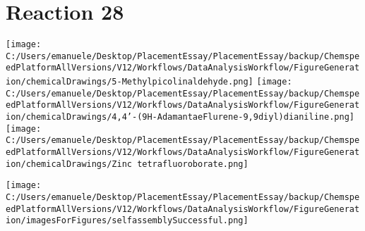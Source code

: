 \documentclass{article}%
\begin{document}
\section*{Reaction 28}%
%
\begin{scheme}[H]%
\begin{minipage}{0.5\textwidth}%
\texttt{[image: C:/Users/emanuele/Desktop/PlacementEssay/PlacementEssay/backup/ChemspeedPlatformAllVersions/V12/Workflows/DataAnalysisWorkflow/FigureGeneration/chemicalDrawings/5-Methylpicolinaldehyde.png]}%
\texttt{[image: C:/Users/emanuele/Desktop/PlacementEssay/PlacementEssay/backup/ChemspeedPlatformAllVersions/V12/Workflows/DataAnalysisWorkflow/FigureGeneration/chemicalDrawings/4,4'-(9H-AdamantaeFlurene-9,9diyl)dianiline.png]}%
\texttt{[image: C:/Users/emanuele/Desktop/PlacementEssay/PlacementEssay/backup/ChemspeedPlatformAllVersions/V12/Workflows/DataAnalysisWorkflow/FigureGeneration/chemicalDrawings/Zinc tetrafluoroborate.png]}%
\end{minipage}%
\begin{minipage}{0.5\textwidth}%
\begin{center}%
\texttt{[image: C:/Users/emanuele/Desktop/PlacementEssay/PlacementEssay/backup/ChemspeedPlatformAllVersions/V12/Workflows/DataAnalysisWorkflow/FigureGeneration/imagesForFigures/selfassemblySuccessful.png]}%
\end{center}%
\end{minipage}%
\caption{Self-assembly of components 3, 13, with Zinc(II) in a 3.0:1.5:1.0 molar ratio in CH$_3$CN at 60\textdegree C for 40h. These are the reagents (starting materials) for reaction 28.}%
\end{scheme}%
\end{document}
